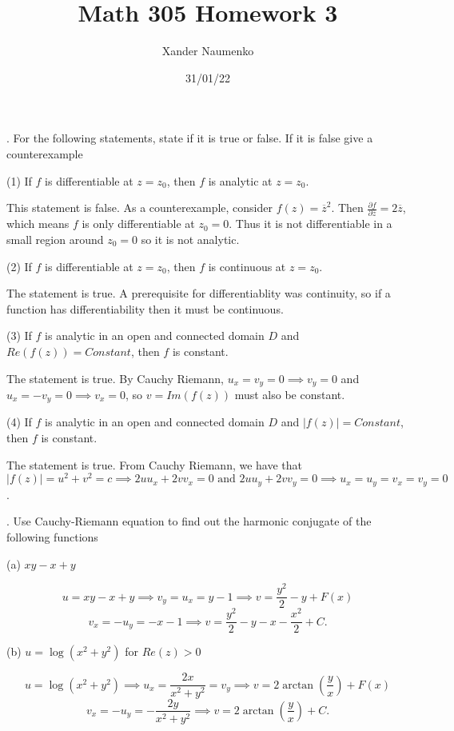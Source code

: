 \documentclass[letterpaper, reqno,11pt]{article}
\begin{document}
\title{Math 305 Homework 3}
\date{31/01/22}
\author{Xander Naumenko}
\maketitle

 
. For the following statements, state if it is true or false. If it is false give a counterexample

(1) If $f$ is differentiable at $z=z_0$, then $f$ is analytic at $z=z_0$.

This statement is false. As a counterexample, consider $f(z)=\overline{z}^2$. Then $\frac{\partial f}{\partial \overline{z}}=2\overline{z}$, which means $f$ is only differentiable at $z_0=0$. Thus it is not differentiable in a small region around $z_0=0$ so it is not analytic. 

 (2) If $f$ is differentiable at $z=z_0$, then $f$ is continuous at $z=z_0$.

 The statement is true. A prerequisite for differentiablity was continuity, so if a function has differentiability then it must be continuous. 

(3) If $f$ is analytic in an open and connected domain $D$ and $ Re(f(z))=Constant$, then $ f$ is constant.

The statement is true. By Cauchy Riemann, $u_x=v_y=0\implies v_y=0$ and  $u_x=-v_y=0\implies v_x=0$, so $v=Im(f(z))$ must also be constant. 

(4) If $f$ is analytic in an open and connected domain $D$ and $ |f(z)| =Constant$, then $ f$ is constant.

The statement is true. From Cauchy Riemann, we have that $|f(z)|=u^2+v^2=c\implies 2uu_x+2vv_x=0\text{ and }2uu_y+2vv_y=0\implies u_x=u_y=v_x=v_y=0$. 

\medskip

. Use Cauchy-Riemann equation to find out the harmonic conjugate of the following functions

(a) $ xy-x+y$

\[
u=xy-x+y\implies v_y=u_x=y-1\implies  v=\frac{y^2}{2}-y+F(x)
\]
\[
v_x=-u_y=-x-1\implies v=\frac{y^2}{2}-y-x-\frac{x^2}{2}+C
.\]

(b) $ u= \log (x^2+y^2)$  for $ Re (z)>0$

\[
u=\log(x^2+y^2)\implies u_x=\frac{2x}{x^2+y^2}=v_y\implies v=2\arctan\left( \frac{y}{x} \right) +F(x)
\]
\[
v_x=-u_y=-\frac{2y}{x^2+y^2}\implies v=2\arctan\left( \frac{y}{x} \right) +C
.\]
\end{document}
